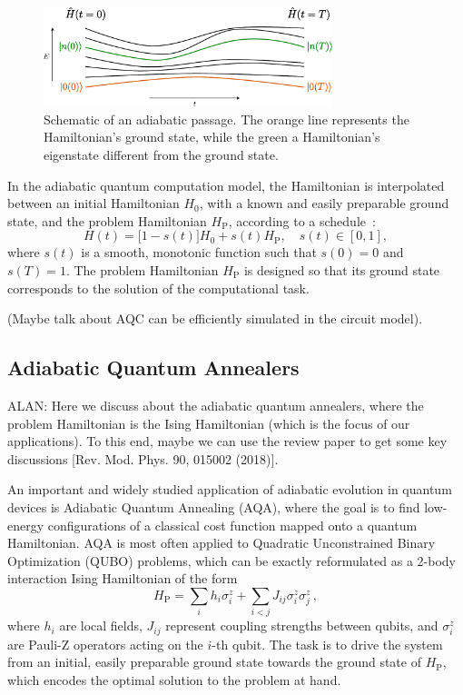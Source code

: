 \begin{figure}[h]
    \centering
    \includegraphics[width=0.75\textwidth]{01-introduction/figs/adiabatic_theorem.pdf}
    \caption{Schematic of an adiabatic passage. The orange line represents the Hamiltonian's ground state, while
    the green a Hamiltonian's eigenstate different from the ground state.}
    \label{fig:adiabatic_passage}
\end{figure}

In the adiabatic quantum computation model, the Hamiltonian is interpolated between an
initial Hamiltonian $H_0$, with a known and easily preparable ground state, and the problem
Hamiltonian $H_\mathrm{P}$, according to a schedule~\cite{albash_adiabatic_2018}:
\begin{equation}
    H(t) = \big[1 - s(t)\big] H_0 + s(t) H_\mathrm{P}, \quad s(t) \in [0,1],
    \label{eq:adiabatic_passage}
\end{equation}
where $s(t)$ is a smooth, monotonic function such that $s(0)=0$ and $s(T)=1$. The problem
Hamiltonian $H_\mathrm{P}$ is designed so that its ground state corresponds to the solution
of the computational task.

{\color{red}(Maybe talk about AQC can be efficiently simulated in the circuit model).}

\subsection{Adiabatic Quantum Annealers}

{\color{blue}ALAN: Here we discuss about the adiabatic quantum annealers, where the problem Hamiltonian
is the Ising Hamiltonian (which is the focus of our applications). To this end, maybe we can use the
review paper to get some key discussions [Rev. Mod. Phys. 90, 015002 (2018)].}

An important and widely studied application of adiabatic evolution in quantum
devices is Adiabatic Quantum Annealing (AQA), where the goal is to find low-energy configurations of
a classical cost function mapped onto a quantum Hamiltonian. AQA is most often applied to Quadratic Unconstrained
Binary Optimization (QUBO) problems, which can be exactly reformulated as a 2-body interaction Ising
Hamiltonian of the form
\begin{equation}
    H_\mathrm{P} = \sum_i h_i \sigma_i^z + \sum_{i<j} J_{ij} \sigma_i^z \sigma_j^z\,,
    \label{eq:ising_hamiltonian}
\end{equation}
where $h_i$ are local fields, $J_{ij}$ represent coupling strengths between qubits, and
$\sigma_i^z$ are Pauli-Z operators acting on the $i$-th qubit. The task is to drive the system
from an initial, easily preparable ground state towards the ground state of $H_\mathrm{P}$,
which encodes the optimal solution to the problem at hand.

